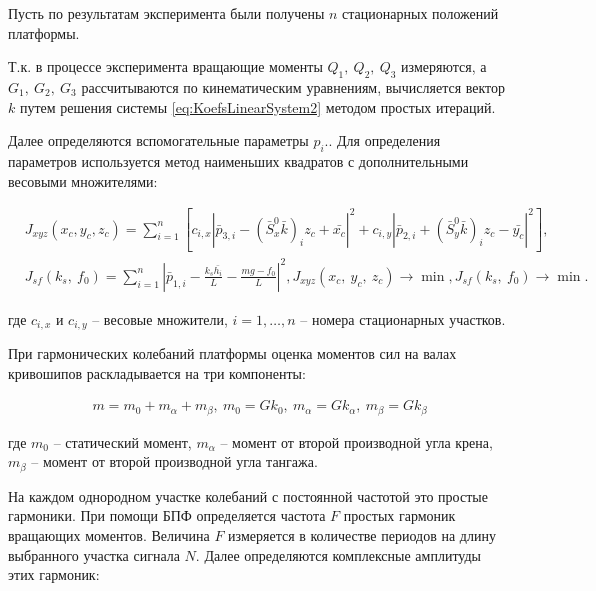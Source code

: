 \vspace{-0pt}
Пусть по результатам эксперимента были получены $n$ стационарных положений платформы.

Т.к. в процессе эксперимента вращающие моменты $Q_1,~Q_2,~Q_3$ измеряются, а $G_1,~G_2,~G_3$ рассчитываются по кинематическим уравнениям, вычисляется вектор $k$ путем решения системы \ref{eq:KoefsLinearSystem2} методом простых итераций.

Далее определяются вспомогательные параметры $p_i$.. Для определения параметров используется метод наименьших квадратов с дополнительными весовыми множителями:

\begin{equation}
\label{eq:LeastSquareMethodFormulation}
\begin{aligned}
& J_{xyz}\left(x_c,y_c,z_c\right)=\sum_{i=1}^n\left[
c_{i,x}\left|\bar{p}_{3,i}-\left(\bar{S}_x^0\bar{k}\right)_iz_c + \bar{x_c}\right|^2 + c_{i,y}\left|\bar{p}_{2,i}+\left(\bar{S}_y^0\bar{k}\right)_iz_c - \bar{y_c}\right|^2\right], \\
& J_{sf}\left(k_s,~f_0\right)=\sum_{i=1}^n{\left|\bar{p}_{1,i}-\frac{k_s\bar{h_i}}{L}-\frac{mg-f_0}{L}\right|}^2, J_{xyz}\left(x_c,~y_c,~z_c\right)\rightarrow\min, J_{sf}\left(k_s,~f_0\right)\rightarrow\min.
\end{aligned}
\end{equation}

где $c_{i,x}$ и $c_{i,y}$  – весовые множители, $i = 1,\dots,n$ – номера стационарных участков.

При гармонических колебаний платформы оценка моментов сил на валах кривошипов раскладывается на три компоненты:

\begin{equation}
\begin{aligned}
	m = m_0 + m_{\alpha} + m_{\beta},~m_0 = Gk_0,~m_{\alpha} = Gk_{\alpha},~m_{\beta} = Gk_{\beta}
\end{aligned}
\end{equation}

где $m_0$ -- статический момент, $m_{\alpha}$ -- момент от второй производной угла крена, $m_{\beta}$ -- момент от второй производной угла тангажа.

На каждом однородном участке колебаний с постоянной частотой это простые гармоники. При помощи БПФ определяется частота $F$ простых гармоник вращающих моментов. Величина $F$ измеряется в количестве периодов на длину выбранного участка сигнала $N$.
Далее определяются комплексные амплитуды этих гармоник:

